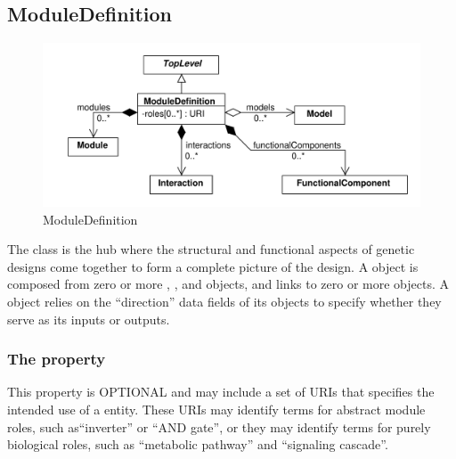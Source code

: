 \subsection{ModuleDefinition}
\label{sec:ModuleDefinition}

\begin{figure}[ht]
\begin{center}
\includegraphics[scale=0.6]{uml/module_definition}
\caption[]{ModuleDefinition}
\label{uml:module_definition}
\end{center}
\end{figure}

The  class is the hub where the structural and functional aspects of genetic designs come together to form a complete picture of the design. 
A  object is composed from zero or more , , and  objects, and links to zero or more  objects. 
A  object relies on the ``direction'' data fields of its  objects to specify whether they serve as its inputs or outputs.

\subsubsection*{The  property}
This property is OPTIONAL and may include a set of URIs that specifies the intended use of a  entity. 
These URIs may identify terms for abstract module roles, such as``inverter'' or ``AND gate'', or they may identify terms for purely biological roles, such as ``metabolic pathway'' and ``signaling cascade''.

